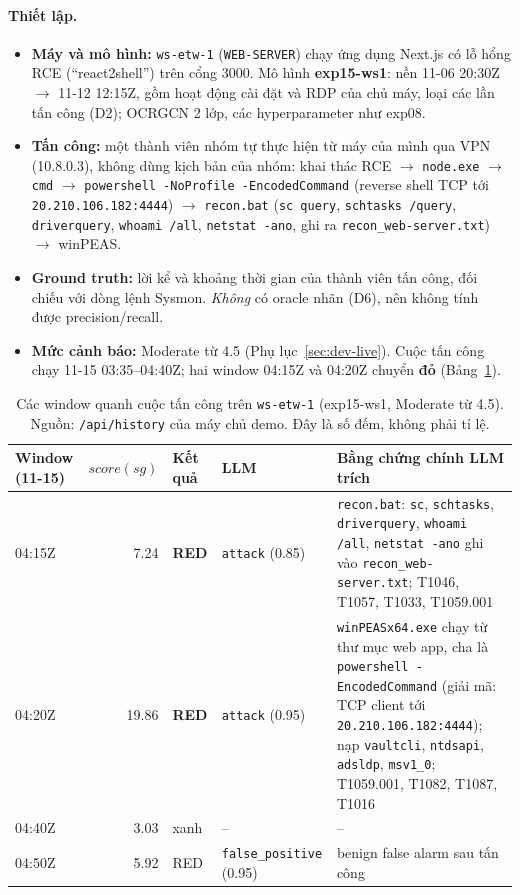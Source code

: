 \paragraph{Thiết lập.}
\begin{itemize}
    \item \textbf{Máy và mô hình:} \texttt{ws-etw-1} (\texttt{WEB-SERVER}) chạy ứng dụng Next.js có lỗ hổng RCE (``react2shell'') trên cổng 3000. Mô hình \textbf{exp15-ws1}: nền 11-06 20:30Z $\rightarrow$ 11-12 12:15Z, gồm hoạt động cài đặt và RDP của chủ máy, loại các lần tấn công (D2); OCRGCN 2 lớp, các hyperparameter như exp08.
    \item \textbf{Tấn công:} một thành viên nhóm tự thực hiện từ máy của mình qua VPN (10.8.0.3), không dùng kịch bản của nhóm: khai thác RCE $\rightarrow$ \texttt{node.exe} $\rightarrow$ \texttt{cmd} $\rightarrow$ \texttt{powershell -NoProfile -EncodedCommand} (reverse shell TCP tới \texttt{20.210.106.182:4444}) $\rightarrow$ \texttt{recon.bat} (\texttt{sc query}, \texttt{schtasks /query}, \texttt{driverquery}, \texttt{whoami /all}, \texttt{netstat -ano}, ghi ra \texttt{recon\_web-server.txt}) $\rightarrow$ winPEAS.
    \item \textbf{Ground truth:} lời kể và khoảng thời gian của thành viên tấn công, đối chiếu với dòng lệnh Sysmon. \emph{Không} có oracle nhãn (D6), nên không tính được precision/recall.
    \item \textbf{Mức cảnh báo:} Moderate từ 4.5 (Phụ lục~\ref{sec:dev-live}). Cuộc tấn công chạy 11-15 03:35--04:40Z; hai window 04:15Z và 04:20Z chuyển \textbf{đỏ} (Bảng~\ref{tab:res-ws1}).
\end{itemize}

\begin{table}[H]
\centering
\small
\begin{tabularx}{\textwidth}{l r l l >{\raggedright\arraybackslash}X}
\toprule
\textbf{Window (11-15)} & \textbf{$score(sg)$} & \textbf{Kết quả} & \textbf{LLM} & \textbf{Bằng chứng chính LLM trích} \\
\midrule
04:15Z & 7.24 & \textbf{RED} & \texttt{attack} (0.85) & \texttt{recon.bat}: \texttt{sc}, \texttt{schtasks}, \texttt{driverquery}, \texttt{whoami /all}, \texttt{netstat -ano} ghi vào \texttt{recon\_web-server.txt}; T1046, T1057, T1033, T1059.001 \\
04:20Z & 19.86 & \textbf{RED} & \texttt{attack} (0.95) & \texttt{winPEASx64.exe} chạy từ thư mục web app, cha là \texttt{powershell -EncodedCommand} (giải mã: TCP client tới \texttt{20.210.106.182:4444}); nạp \texttt{vaultcli}, \texttt{ntdsapi}, \texttt{adsldp}, \texttt{msv1\_0}; T1059.001, T1082, T1087, T1016 \\
04:40Z & 3.03 & xanh & -- & -- \\
04:50Z & 5.92 & RED & \texttt{false\_positive} (0.95) & benign false alarm sau tấn công \\
\bottomrule
\end{tabularx}
\caption{Các window quanh cuộc tấn công trên \texttt{ws-etw-1} (exp15-ws1, Moderate từ 4.5). Nguồn: \texttt{/api/history} của máy chủ demo. Đây là số đếm, không phải tỉ lệ.}
\label{tab:res-ws1}
\end{table}

